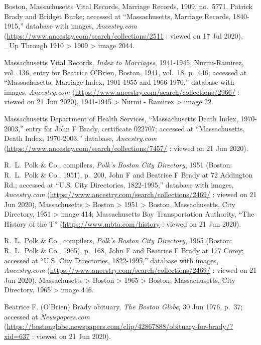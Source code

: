 \begin{thebibliography}{999}
Boston, Massachusetts Vital Records, Marriage Records, 1909, no.\ 5771, Patrick Brady and Bridget Burke; accessed at ``Massachusetts, Marriage Records, 1840-1915,'' database with images, \textit{Ancestry.com} (\url{https://www.ancestry.com/search/collections/2511} : viewed on 17 Jul 2020), \_Up Through 1910 > 1909 > image 2044.

Massachusetts Vital Records, \textit{Index to Marriages}, 1941-1945, Nurmi-Ramirez, vol.\ 136, entry for Beatrice O'Brien, Boston, 1941, vol.\ 18, p.\ 446; accessed at ``Massachusetts, Marriage Index, 1901-1955 and 1966-1970,'' database with images, \textit{Ancestry.com} (\url{https://www.ancestry.com/search/collections/2966/} : viewed on 21 Jun 2020), 1941-1945 > Nurmi - Ramirez > image 22.

Massachusetts Department of Health Services, ``Massachusetts Death Index, 1970-2003,'' entry for John F Brady, certificate 022707; accessed at ``Massachusetts, Death Index, 1970-2003,'' database, \textit{Ancestry.com} (\url{https://www.ancestry.com/search/collections/7457/} : viewed on 21 Jun 2020).

R.\ L.\ Polk \& Co., compilers, \textit{Polk's Boston City Directory}, 1951 (Boston: R.\ L.\ Polk \& Co., 1951), p.\ 200, John F and Beatrice F Brady at 72 Addington Rd.; accessed at ``U.S. City Directories, 1822-1995,'' database with images, \textit{Ancestry.com} (\url{https://www.ancestry.com/search/collections/2469/} : viewed on 21 Jun 2020), Massachusetts > Boston > 1951 > Boston, Massachusetts, City Directory, 1951 > image 414; Massachusetts Bay Transportation Authority, ``The History of the T'' (\url{https://www.mbta.com/history} : viewed on 21 Jun 2020).

R.\ L.\ Polk \& Co., compilers, \textit{Polk's Boston City Directory}, 1965 (Boston: R.\ L.\ Polk \& Co., 1965), p.\ 168, John F and Beatrice F Brady at 177 Corey; accessed at ``U.S. City Directories, 1822-1995,'' database with images, \textit{Ancestry.com} (\url{https://www.ancestry.com/search/collections/2469/} : viewed on 21 Jun 2020), Massachusetts > Boston > 1965 > Boston, Massachusetts, City Directory, 1965 > image 446.

Beatrice F. (O'Brien) Brady obituary, \textit{The Boston Globe}, 30 Jun 1976, p.\ 37; accessed at \textit{Newspapers.com} (\url{https://bostonglobe.newspapers.com/clip/42867888/obituary-for-brady/?xid=637} : viewed on 21 Jun 2020).
	
\end{thebibliography}